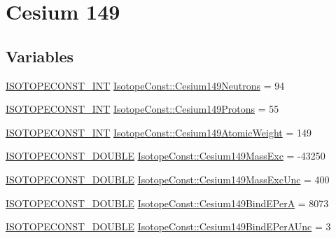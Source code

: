 \hypertarget{group___isotope_const-_cesium-_cs149}{}\section{Cesium 149}
\label{group___isotope_const-_cesium-_cs149}
\subsection*{Variables}
\begin{DoxyCompactItemize}
\item 
\mbox{\hyperlink{group___isotope_const-_macros_ga5f18360b3e99483a35c32d789e62621c}{I\+S\+O\+T\+O\+P\+E\+C\+O\+N\+S\+T\+\_\+\+I\+NT}} \mbox{\hyperlink{group___isotope_const-_cesium-_cs149_ga9934aeb56bec517cf2a4f50b1bb4ccd0}{Isotope\+Const\+::\+Cesium149\+Neutrons}} = 94
\item 
\mbox{\hyperlink{group___isotope_const-_macros_ga5f18360b3e99483a35c32d789e62621c}{I\+S\+O\+T\+O\+P\+E\+C\+O\+N\+S\+T\+\_\+\+I\+NT}} \mbox{\hyperlink{group___isotope_const-_cesium-_cs149_ga32e1c7d023302a5a8426616a092d08da}{Isotope\+Const\+::\+Cesium149\+Protons}} = 55
\item 
\mbox{\hyperlink{group___isotope_const-_macros_ga5f18360b3e99483a35c32d789e62621c}{I\+S\+O\+T\+O\+P\+E\+C\+O\+N\+S\+T\+\_\+\+I\+NT}} \mbox{\hyperlink{group___isotope_const-_cesium-_cs149_gaf5e434c1e1eebaa4348473542f008da9}{Isotope\+Const\+::\+Cesium149\+Atomic\+Weight}} = 149
\item 
\mbox{\hyperlink{group___isotope_const-_macros_ga8f45a7272ce02c0b4c65c44636ed719a}{I\+S\+O\+T\+O\+P\+E\+C\+O\+N\+S\+T\+\_\+\+D\+O\+U\+B\+LE}} \mbox{\hyperlink{group___isotope_const-_cesium-_cs149_ga9255f37023aeae9eca0820997b2c817f}{Isotope\+Const\+::\+Cesium149\+Mass\+Exc}} = -\/43250
\item 
\mbox{\hyperlink{group___isotope_const-_macros_ga8f45a7272ce02c0b4c65c44636ed719a}{I\+S\+O\+T\+O\+P\+E\+C\+O\+N\+S\+T\+\_\+\+D\+O\+U\+B\+LE}} \mbox{\hyperlink{group___isotope_const-_cesium-_cs149_gad234022f90d9f4f5a47318df249fb69b}{Isotope\+Const\+::\+Cesium149\+Mass\+Exc\+Unc}} = 400
\item 
\mbox{\hyperlink{group___isotope_const-_macros_ga8f45a7272ce02c0b4c65c44636ed719a}{I\+S\+O\+T\+O\+P\+E\+C\+O\+N\+S\+T\+\_\+\+D\+O\+U\+B\+LE}} \mbox{\hyperlink{group___isotope_const-_cesium-_cs149_ga299c76ee0fc4419927973d18acb6f033}{Isotope\+Const\+::\+Cesium149\+Bind\+E\+PerA}} = 8073
\item 
\mbox{\hyperlink{group___isotope_const-_macros_ga8f45a7272ce02c0b4c65c44636ed719a}{I\+S\+O\+T\+O\+P\+E\+C\+O\+N\+S\+T\+\_\+\+D\+O\+U\+B\+LE}} \mbox{\hyperlink{group___isotope_const-_cesium-_cs149_ga09e024c226a6d2f0d559d659170dd03a}{Isotope\+Const\+::\+Cesium149\+Bind\+E\+Per\+A\+Unc}} = 3

\end{DoxyCompactItemize}
